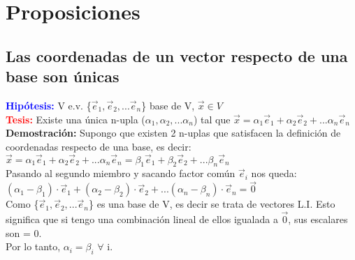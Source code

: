 \documentclass{article}
\begin{document}
\section{Proposiciones}
\subsection{Las coordenadas de un vector respecto de una base 
son únicas}
{\bfseries \textcolor{blue}{Hipótesis:}} V e.v. \{$\vec{e}_{1}, \vec{e}_2,... \vec{e}_n $\} base de V, $\vec{x} \in V$ \\
{\bfseries \textcolor{red}{Tesis:}} Existe una única n-upla ($\alpha_{1}, \alpha_{2},... \alpha_{n}$) tal que $\vec{x} = \alpha_{1}\vec{e}_{1} + \alpha_{2}\vec{e}_{2} +... \alpha_{n}\vec{e}_{n}$\\
{\bfseries Demostración:} Supongo que existen 2 n-uplas que satisfacen la definición de coordenadas respecto de una base, es decir:\\
$\vec{x} = \alpha_{1}\vec{e}_{1} + \alpha_{2}\vec{e}_{2} +... \alpha_{n}\vec{e}_{n} = \beta_{1}\vec{e}_{1} + \beta_{2}\vec{e}_{2} +... \beta_{n}\vec{e}_{n}$\\
Pasando al segundo miembro y sacando factor común $\vec{e}_i$ nos queda: \\
$(\alpha_{1} - \beta_{1})\cdot\vec{e}_{1} + (\alpha_{2} - \beta_{2})\cdot\vec{e}_{2} +... (\alpha_{n} -\beta_{n})\cdot\vec{e}_{n} = \vec{0}$\\
Como \{$\vec{e}_{1}, \vec{e}_2,... \vec{e}_n $\} es una base de V, es decir se trata de vectores L.I. Esto significa que si tengo una combinación lineal de ellos igualada a $\vec{0}$, sus escalares son = 0. \\
Por lo tanto, $\alpha_{i} = \beta_{i}$ $\forall$ i.
\end{document}
